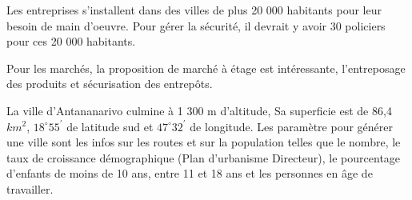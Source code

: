 \documentclass[11pt]{article}
\begin{document}
Les entreprises s'installent dans des villes de plus 20 000 habitants pour leur besoin de main d'oeuvre. Pour gérer la sécurité, il devrait y avoir 30 policiers pour ces 20 000 habitants.

Pour les marchés, la proposition de marché à étage est intéressante, l'entreposage des produits et sécurisation des entrepôts.

La ville d'Antananarivo culmine à 1 300 m d'altitude, Sa superficie est de 86,4 $km^2$, $18^{\circ}55^{\prime}$ de latitude sud et $47^{\circ}32^{\prime}$ de longitude. Les paramètre pour générer une ville sont les infos sur les routes et sur la population telles que le nombre, le taux de croissance démographique (Plan d'urbanisme Directeur), le pourcentage d'enfants de moins de 10 ans, entre 11 et 18 ans et les personnes en âge de travailler.
\end{document}

